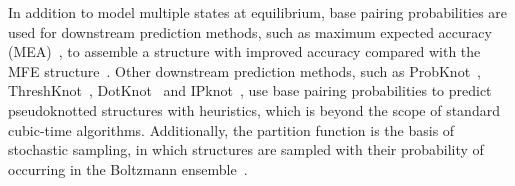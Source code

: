 




In addition to model multiple states at equilibrium, 
base pairing probabilities are used for downstream prediction methods, 
such as maximum expected accuracy (MEA)~\cite{Knudsen+Hein:2003, do+:2006}, 
to assemble a structure with improved accuracy compared with the MFE structure~\cite{lu+:2009}.
Other downstream prediction methods, 
such as 
ProbKnot~\cite{bellaousov+mathews:2010}, 
ThreshKnot~\cite{Zhang+:2019},
DotKnot~\cite{Sperschneider+Datta:2010} 
and IPknot~\cite{sato+:2011},
use base pairing probabilities to predict pseudoknotted structures with heuristics,
which is beyond the scope of standard cubic-time algorithms.
Additionally, the partition function 
is the basis of stochastic sampling, 
in which structures are sampled with their probability of occurring 
in the Boltzmann ensemble~\cite{Ding+Lawrence:2003, mathews:2006}.

